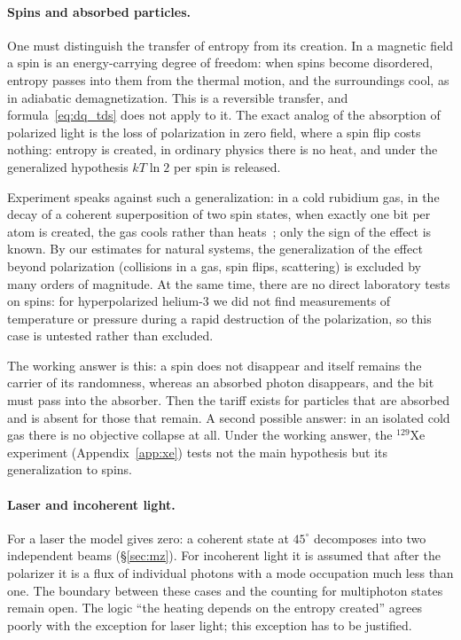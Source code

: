 \documentclass[11pt,a4paper]{article}
\newcommand{\Sref}[1]{\hyperref[#1]{\S\ref{#1}}}
\begin{document}
\paragraph{Spins and absorbed particles.}
One must distinguish the transfer of entropy from its creation. In a magnetic field a spin is an energy-carrying degree of freedom: when spins become disordered, entropy passes into them from the thermal motion, and the surroundings cool, as in adiabatic demagnetization. This is a reversible transfer, and formula~\eqref{eq:dq_tds} does not apply to it. The exact analog of the absorption of polarized light is the loss of polarization in zero field, where a spin flip costs nothing: entropy is created, in ordinary physics there is no heat, and under the generalized hypothesis $kT\ln 2$ per spin is released.

Experiment speaks against such a generalization: in a cold rubidium gas, in the decay of a coherent superposition of two spin states, when exactly one bit per atom is created, the gas cools rather than heats~\cite{lewandowski2003}; only the sign of the effect is known. By our estimates for natural systems, the generalization of the effect beyond polarization (collisions in a gas, spin flips, scattering) is excluded by many orders of magnitude. At the same time, there are no direct laboratory tests on spins: for hyperpolarized helium-3 we did not find measurements of temperature or pressure during a rapid destruction of the polarization, so this case is untested rather than excluded.

The working answer is this: a spin does not disappear and itself remains the carrier of its randomness, whereas an absorbed photon disappears, and the bit must pass into the absorber. Then the tariff exists for particles that are absorbed and is absent for those that remain. A second possible answer: in an isolated cold gas there is no objective collapse at all. Under the working answer, the $^{129}$Xe experiment (Appendix~\ref{app:xe}) tests not the main hypothesis but its generalization to spins.

\paragraph{Laser and incoherent light.}
For a laser the model gives zero: a coherent state at $45^\circ$ decomposes into two independent beams (\Sref{sec:mz}). For incoherent light it is assumed that after the polarizer it is a flux of individual photons with a mode occupation much less than one. The boundary between these cases and the counting for multiphoton states remain open. The logic ``the heating depends on the entropy created'' agrees poorly with the exception for laser light; this exception has to be justified.
\end{document}
